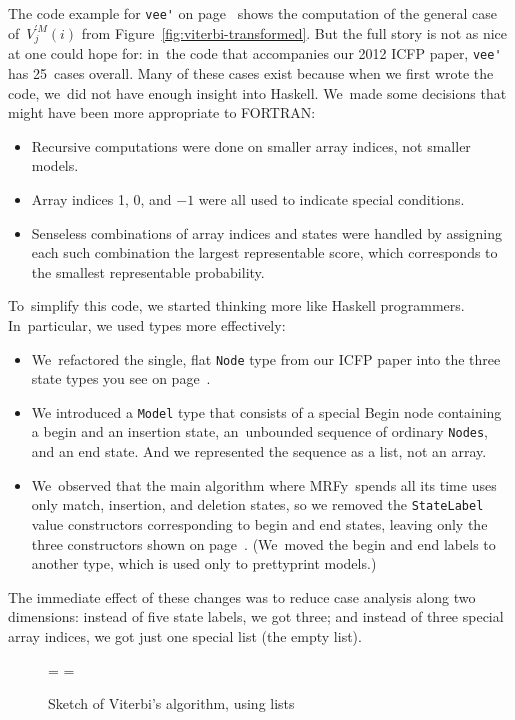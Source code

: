 \documentclass[]{jfp1}
\newcommand\mrfy{MRFy} %
\newcommand\figref[1]{Figure~\ref{fig:#1}}
\newcommand\figlabel[1]{\label{fig:#1}}
\newif\ifverbatimsmall
\newcommand\smallverbatiminput[1]{%
  \verbatimsmalltrue
  \presvtopsep=\topsep
  \topsep=0.78\topsep
  \verbatimsmallfalse
  \topsep=\presvtopsep
}
\begin{document}
The code example for \verb+vee'+ on page~\pageref{code:vee-prime}
shows the computation of the general case of~$V^{\prime M}_j(i)$ from 
\figref{viterbi-transformed}.
But the full story is not as nice at one could hope for:
in~the code that accompanies our 2012 ICFP paper,
\verb+vee'+ has 25~cases overall.
Many of these cases exist because when we first wrote the code, we~did
not have enough insight into 
Haskell.
We~made some decisions that might have been more
appropriate to FORTRAN:
\begin{itemize}
\item
Recursive computations were done on smaller array indices, not smaller
models.
\item
Array indices 1, 0, and $-1$ were all used to indicate special
conditions.
\item
Senseless combinations of array indices and states were handled by
assigning each such combination the largest representable score, which
corresponds to the smallest representable probability.
\end{itemize}
%
%
To~simplify this code, we started thinking more like Haskell
programmers.
In~particular, we used types more effectively:
\begin{itemize}
\item
We~refactored the single, flat \texttt{Node} type from our ICFP paper
into the three state types you see on page~\pageref{code:model3-node}.
\item 
We introduced a \texttt{Model} type that consists of a special Begin
node containing a begin and an insertion state, an~unbounded sequence
of ordinary \texttt{Nodes}, and an end state.
And we represented the sequence as a list, not an array.
\item
We~observed that the main algorithm where \mrfy\ spends all its time
uses only match, insertion, and deletion states, so we removed the
\texttt{StateLabel} value constructors corresponding to begin and end
states, leaving only the three constructors shown on
page~\pageref{code:state-label}. 
(We~moved the begin and end labels to another type, which is used only
to prettyprint models.) 
\end{itemize}
The immediate effect of these changes was to reduce case analysis along
two dimensions:
instead of five state labels, we got three;
and instead of three special array indices, we got just one special
list (the empty list).

\begin{figure}
\noindent\hspace*{1.5cm}\begin{minipage}{11cm}
\smallverbatiminput{list-viterbi}
\smallskip
\end{minipage}

\caption{Sketch of Viterbi's algorithm, using lists}
\figlabel{list-viterbi}
\end{figure}
\end{document}
